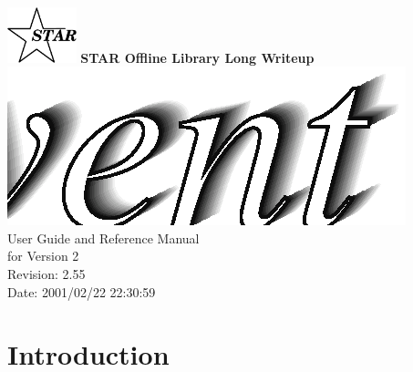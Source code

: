 \documentclass[twoside]{article}
\begin{document}
%
%
\begin{titlepage}
\pagestyle{empty}
\vspace*{-25mm}
\begin{center}
  \mbox{\includegraphics[width=2cm]{StarIcon.eps}}
  {\Large\bf STAR Offline Library Long Writeup}
  \hfill\mbox{}\\[3cm]
  \mbox{\includegraphics[width=\textwidth]{StEventTitle.eps}}
  \hfill\mbox{}\\[3cm]
  {\LARGE User Guide and Reference Manual \\[5mm] for Version 2}\\[2cm]
  {\LARGE $ $Revision: 2.55 $ $}  \\[5mm] %
  {\LARGE $ $Date: 2001/02/22 22:30:59 $ $}  %
  \vfill
\end{center}
\cleardoublepage
\end{titlepage}

%
%
\tableofcontents
\cleardoublepage

%
%

\section{Introduction} %
\end{document}
